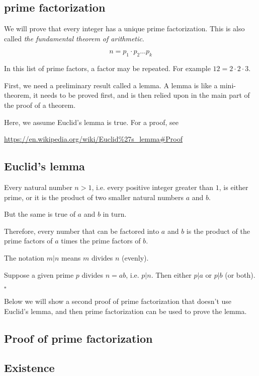 \documentclass[11pt, oneside]{article}
\begin{document}
\subsection*{prime factorization}

We will prove that every integer has a unique prime factorization.  This is also called \emph{the fundamental theorem of arithmetic}.

\[ n = p_1 \cdot p_2 \dots p_k \]

In this list of prime factors, a factor may be repeated.  For example $12 = 2 \cdot 2 \cdot 3$.

First, we need a preliminary result called a lemma.  A lemma is like a mini-theorem, it needs to be proved first, and is then relied upon in the main part of the proof of a theorem.

Here, we assume Euclid's lemma is true.  For a proof, see

\url{https://en.wikipedia.org/wiki/Euclid%27s_lemma#Proof}

\subsection*{Euclid's lemma}

Every natural number $n > 1$, i.e. every positive integer greater than $1$, is either prime, or it is the product of two smaller natural numbers $a$ and $b$.

But the same is true of $a$ and $b$ in turn.

Therefore, every number that can be factored into $a$ and $b$ is the product of the prime factors of $a$ times the prime factors of $b$.  

The notation $m|n$ means $m$ divides $n$ (evenly).

Suppose a given prime $p$ divides $n = ab$, i.e. $p|n$.  Then either $p|a$ or  $p|b$ (or both).

$\square$

Below we will show a second proof of prime factorization that doesn't use Euclid's lemma, and then prime factorization can be used to prove the lemma.

\subsection*{Proof of prime factorization}

\subsection*{Existence}
\end{document}
